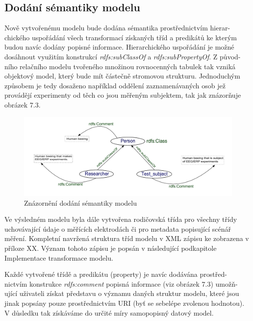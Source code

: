 \documentclass{projekt}
\begin{document}
\subsection{Dodání sémantiky modelu}
\hspace{0.65cm}Nově vytvořenému modelu bude dodána sémantika prostřednictvím hierar-\\chického uspořádání všech transformací získaných tříd a predikátů ke kterým budou navíc dodány popisné informace. Hierarchického uspořádání je možné dosáhnout využitím konstrukcí {\it rdfs:subClassOf} a {\it rdfs:subPropertyOf}. Z původ-\\ního relačního modelu tvořeného množinou rovnocenných tabulek tak vzniká objektový model, který bude mít částečně stromovou strukturu. Jednoduchým způsobem je tedy dosaženo například oddělení zaznamenávaných osob jež provádějí experimenty od těch co jsou měřeným subjektem, tak jak znázorňuje obrázek 7.3.


\begin{figure}[htb]
\begin{center}
\includegraphics[scale=0.52]{semantika.pdf}
\caption{Znázornění dodání sémantiky modelu}
\end{center}
\end{figure}

Ve výsledném modelu byla dále vytvořena rodičovská třída pro všechny třídy uchovávající údaje o měřících elektrodách či pro metadata popisující scénář měření. Kompletní navržená struktura tříd modelu v XML zápisu ke zobrazena v příloze XX. Význam tohoto zápisu je popsán v následující podkapitole Implementace transformace modelu.

Každé vytvořené třídě a predikátu (property) je navíc dodávána prostřed-\\nictvím konstrukce {\it rdfs:comment} popisná informace (viz obrázek 7.3) umožň-\\ující uživateli získat představu o významu daných struktur modelu, které jsou jinak popsány pouze prostřednictvím URI (byť se sebelépe zvolenou hodnotou). V důsledku tak získáváme do určité míry samopopisný datový model.
\end{document}

